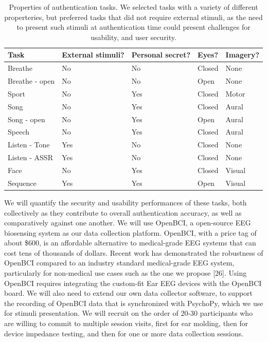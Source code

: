 \documentclass[11pt]{article}
\begin{document}
\begin{table}[h]
\centering
\begin{tabular}{lllll}
Task & External stimuli? & Personal secret? & Eyes? & Imagery?\\
\hline
Breathe & No & No & Closed & None\\
Breathe - open & No & No & Open & None\\
Sport & No & Yes & Closed & Motor\\
Song & No & Yes & Closed & Aural\\
Song - open & No & Yes & Open & Aural\\
Speech & No & Yes & Closed & Aural\\
Listen - Tone & Yes & No & Closed & None\\
Listen - ASSR & Yes & No & Closed & None\\
Face & No & Yes & Closed & Visual\\
Sequence & Yes & Yes & Open & Visual\\
\hline
\end{tabular}
\caption{Properties of authentication tasks. We selected tasks with a variety of different properteries, but preferred tasks that did not require external stimuli, as the need to present such stimuli at authentication time could present challenges for usability, and user security.}
\end{table}

We will quantify the security and usability performances of these
tasks, both collectively as they contribute to overall authentication accuracy, as
well as comparatively against one another.
We will use OpenBCI, a open-source EEG biosensing system as our data
collection platform. OpenBCI, with a price tag of about \$600,
is an affordable alternative to medical-grade EEG systems that can
cost tens of thousands of dollars. Recent work has demonstrated the robustness 
of OpenBCI compared to an industry standard medical-grade EEG system, 
particularly for non-medical use cases such as the one we propose [26].
Using OpenBCI requires integrating the custom-fit Ear EEG devices with
the OpenBCI board. We will also need to extend our own data collector
software, to support the recording of OpenBCI data that is synchronized with
PsychoPy, which we use for stimuli presentation. We will recruit on the order of
20-30 participants who are willing to commit to multiple session visits, first for ear
molding, then for device impedance testing, and then for one or more data
collection sessions.
\end{document}
